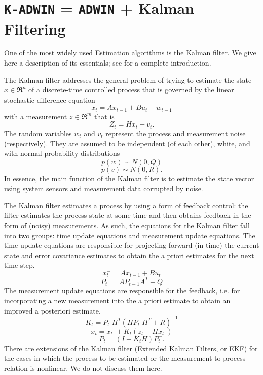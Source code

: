 

\section{{\tt K-ADWIN} = {\tt ADWIN} + Kalman Filtering}
\label{Skadwin}



One of the most widely used Estimation algorithms is the Kalman filter. We give here a description
of its essentials; see \cite{welch} for a complete introduction.

The Kalman filter addresses the general problem of trying to estimate the state $x \in \Re^n$ 
of a discrete-time controlled process that is governed by the linear stochastic difference equation
$$x_t=Ax_{t-1} + B u_t + w_{t-1}$$
with a measurement $z \in \Re^m$ that is
$$Z_t = H x_t + v_t.$$
%
The random variables $w_t$ and $v_t$ represent the process and measurement noise
(respectively). They are assumed to be independent (of each other), white, and with
normal probability distributions
$$p(w) \sim N(0,Q) $$
$$p(v) \sim N(0,R). $$
%
In essence, the main function of the Kalman filter is to estimate the state vector 
using system sensors and measurement data  corrupted by noise.

The Kalman filter estimates a process by using a form of feedback control: the filter
estimates the process state at some time and then obtains feedback in the form of (noisy)
measurements. As such, the equations for the Kalman filter fall into two groups: time
update equations and measurement update equations. The time update equations are
responsible for projecting forward (in time) the current state and error covariance
estimates to obtain the a priori estimates for the next time step. 
$$x^-_t=A x_{t-1} + B u_t$$
$$P^-_t= AP_{t-1} A^T +Q$$
%
The measurement update equations are responsible for the feedback, i.e. for 
incorporating a new measurement into the a priori estimate to obtain an improved a posteriori estimate.
%
$$K_t=P^-_t H^T(H P^-_tH^T+R)^{-1}$$
$$ x_t=x_t^- + K_t(z_t -Hx_t^-)$$
$$P_t=(I-K_t H) P^-_t.$$
%
There are extensions of the Kalman filter (Extended Kalman Filters, or EKF)
for the cases in which the process to be estimated or the measurement-to-process
relation is nonlinear. We do not discuss them here. 

